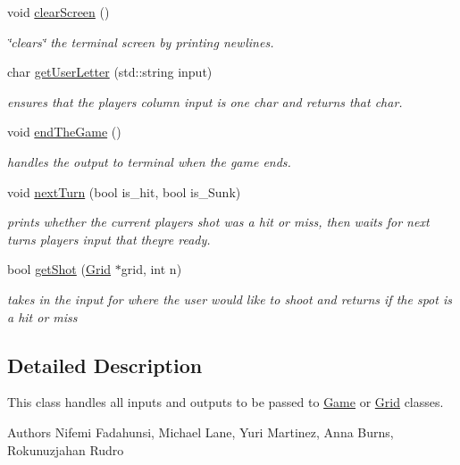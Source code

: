 \begin{DoxyCompactItemize}
void \hyperlink{classExecutive_a6b52a0ec7783ffed51d117d60781c364}{clear\+Screen} ()
\begin{DoxyCompactList}\small\item\em \char`\"{}clears\char`\"{} the terminal screen by printing newlines. \end{DoxyCompactList}\item 
char \hyperlink{classExecutive_afeb631927beaf50e17e5a0ee0b85895f}{get\+User\+Letter} (std\+::string input)
\begin{DoxyCompactList}\small\item\em ensures that the player\textquotesingle{}s column input is one char and returns that char. \end{DoxyCompactList}\item 
void \hyperlink{classExecutive_a7ecea33073bc684a8efdd3bd08f724e3}{end\+The\+Game} ()
\begin{DoxyCompactList}\small\item\em handles the output to terminal when the game ends. \end{DoxyCompactList}\item 
void \hyperlink{classExecutive_a7bdfcc2bf91bbd24f1b7d3642e3c8cfe}{next\+Turn} (bool is\+\_\+hit, bool is\+\_\+\+Sunk)
\begin{DoxyCompactList}\small\item\em prints whether the current player\textquotesingle{}s shot was a hit or miss, then waits for next turn\textquotesingle{}s player\textquotesingle{}s input that they\textquotesingle{}re ready. \end{DoxyCompactList}\item 
bool \hyperlink{classExecutive_af66dfa4b2bd996fdbcb7159d143a1d89}{get\+Shot} (\hyperlink{classGrid}{Grid} $\ast$grid, int n)
\begin{DoxyCompactList}\small\item\em takes in the input for where the user would like to shoot and returns if the spot is a hit or miss \end{DoxyCompactList}\end{DoxyCompactItemize}


\subsection{Detailed Description}
This class handles all inputs and outputs to be passed to \hyperlink{classGame}{Game} or \hyperlink{classGrid}{Grid} classes. 

\begin{DoxyAuthor}{Authors}
Nifemi Fadahunsi, Michael Lane, Yuri Martinez, Anna Burns, Rokunuzjahan Rudro 
\end{DoxyAuthor}


